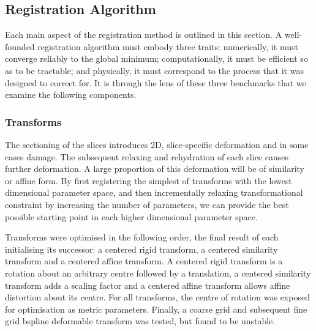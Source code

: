 	\subsection{Registration Algorithm} %
  \label{sub:registration_algorithm}
    Each main aspect of the registration method is outlined in this section. A well-founded registration algorithm must embody three traits: numerically, it must converge reliably to the global minimum; computationally, it must be efficient so as to be tractable; and physically, it must correspond to the process that it was designed to correct for. It is through the lens of these three benchmarks that we examine the following components.
    
    \subsubsection{Transforms} %
    \label{ssub:transforms}
			The sectioning of the slices introduces 2D, slice-specific deformation and in some cases damage. The subsequent relaxing and rehydration of each slice causes further deformation. A large proportion of this deformation will be of similarity or affine form. By first registering the simplest of transforms with the lowest dimensional parameter space, and then incrementally relaxing transformational constraint by increasing the number of parameters, we can provide the best possible starting point in each higher dimensional parameter space.
			
      Transforms were optimised in the following order, the final result of each initialising its successor: a centered rigid transform, a centered similarity transform and a centered affine transform. A centered rigid transform is a rotation about an arbitrary centre followed by a translation, a centered similarity transform adds a scaling factor and a centered affine transform allows affine distortion about its centre.  For all transforms, the centre of rotation was exposed for optimisation as metric parameters. Finally, a coarse grid and subsequent fine grid bspline deformable transform was tested, but found to be unstable.
    

